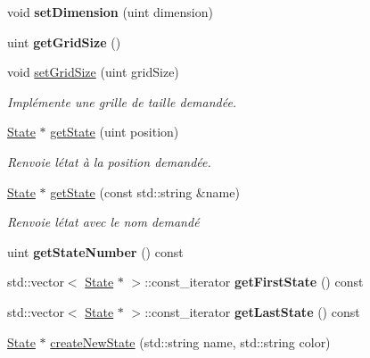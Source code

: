 \begin{DoxyCompactItemize}
void {\bfseries set\+Dimension} (uint dimension)
\item 
\mbox{\label{class_simulator_manager_acddaaa3b1b34a1eaaa04d3a66bbc3c61}} 
uint {\bfseries get\+Grid\+Size} ()
\item 
void \mbox{\hyperlink{class_simulator_manager_af21cbe0dd12b91b567a0169d39459694}{set\+Grid\+Size}} (uint grid\+Size)
\begin{DoxyCompactList}\small\item\em Implémente une grille de taille demandée. \end{DoxyCompactList}\item 
\mbox{\hyperlink{class_state}{State}} $\ast$ \mbox{\hyperlink{class_simulator_manager_a54c020cc0735a41d4ed14e83d5b073c7}{get\+State}} (uint position)
\begin{DoxyCompactList}\small\item\em Renvoie l\textquotesingle{}état à la position demandée. \end{DoxyCompactList}\item 
\mbox{\hyperlink{class_state}{State}} $\ast$ \mbox{\hyperlink{class_simulator_manager_aa2158ff5323a4d4748b548175e5db148}{get\+State}} (const std\+::string \&name)
\begin{DoxyCompactList}\small\item\em Renvoie l\textquotesingle{}état avec le nom demandé \end{DoxyCompactList}\item 
\mbox{\label{class_simulator_manager_a0019daf92959931ba6abee3e0ffd022d}} 
uint {\bfseries get\+State\+Number} () const
\item 
\mbox{\label{class_simulator_manager_a1ab2c93fa19badf967918a0afca708f0}} 
std\+::vector$<$ \mbox{\hyperlink{class_state}{State}} $\ast$ $>$\+::const\+\_\+iterator {\bfseries get\+First\+State} () const
\item 
\mbox{\label{class_simulator_manager_a75bfd6a827f18229f87f9509635bf232}} 
std\+::vector$<$ \mbox{\hyperlink{class_state}{State}} $\ast$ $>$\+::const\+\_\+iterator {\bfseries get\+Last\+State} () const
\item 
\mbox{\hyperlink{class_state}{State}} $\ast$ \mbox{\hyperlink{class_simulator_manager_a2f8bcdd270d9796aa9c5ba7ddc9c9ab8}{create\+New\+State}} (std\+::string name, std\+::string color)

\end{DoxyCompactItemize}
